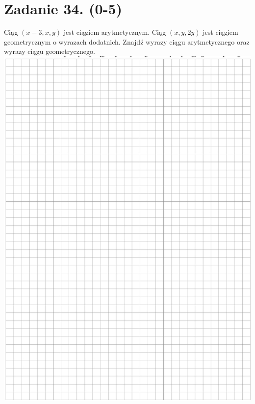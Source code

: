 \documentclass[10pt]{article}
\begin{document}
\section*{Zadanie 34. (0-5)}
Ciąg \((x-3, x, y)\) jest ciągiem arytmetycznym. Ciąg \((x, y, 2 y)\) jest ciągiem geometrycznym o wyrazach dodatnich. Znajdź wyrazy ciągu arytmetycznego oraz wyrazy ciągu geometrycznego.\\
\includegraphics[max width=\textwidth, center]{2024_11_21_99eb8e6624b497a5af43g-18}
\end{document}
